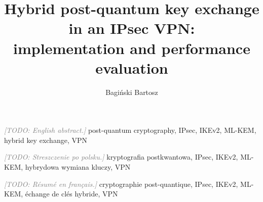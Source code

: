\documentclass[
    bindingoffset=5mm,  %
    footnoteindent=3mm, %
    hyphenation=true    %
]{src/wut-thesis}
\newcommand{\placeholder}[1]{\textcolor{gray}{\textit{[TODO: #1]}}}
\begin{document}
\specjalnosc{}
\title{
    Hybrid post-quantum key exchange in an IPsec VPN: \\
    implementation and performance evaluation
}
\author{Bagiński Bartosz}
\date{\the\year}
\maketitle

\cleardoublepage
\abstract \placeholder{English abstract.}
\keywords post-quantum cryptography, IPsec, IKEv2, ML-KEM, hybrid key exchange, VPN

\clearpage
\secondabstract \placeholder{Streszczenie po polsku.}
\secondkeywords kryptografia postkwantowa, IPsec, IKEv2, ML-KEM, hybrydowa wymiana kluczy, VPN

\clearpage
\thirdabstract \placeholder{Résumé en français.}
\thirdkeywords cryptographie post-quantique, IPsec, IKEv2, ML-KEM, échange de clés hybride, VPN
\finishthirdabstract

\pagestyle{plain}

\cleardoublepage
\tableofcontents

\cleardoublepage
\pagestyle{headings}










\cleardoublepage
{\sloppy\printbibliography}
\clearpage
\end{document}
